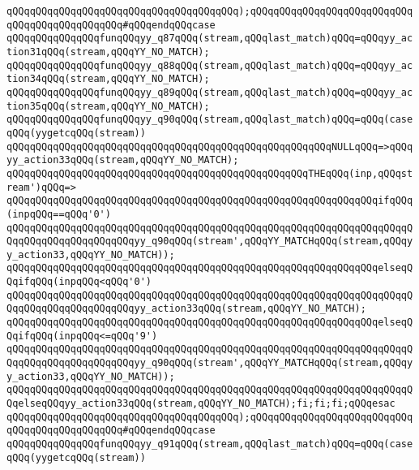 \verb|qQQqqQQqqQQqqQQqqQQqqQQqqQQqqQQqqQQqqQQq);qQQqqQQqqQQqqQQqqQQqqQQqqQQqqQQqqQQqqQQqqQQqqQQq#qQQqendqQQqcase|\newline
\verb|qQQqqQQqqQQqqQQqfunqQQqyy_q87qQQq(stream,qQQqlast_match)qQQq=qQQqyy_action31qQQq(stream,qQQqYY_NO_MATCH);|\newline
\verb|qQQqqQQqqQQqqQQqfunqQQqyy_q88qQQq(stream,qQQqlast_match)qQQq=qQQqyy_action34qQQq(stream,qQQqYY_NO_MATCH);|\newline
\verb|qQQqqQQqqQQqqQQqfunqQQqyy_q89qQQq(stream,qQQqlast_match)qQQq=qQQqyy_action35qQQq(stream,qQQqYY_NO_MATCH);|\newline
\verb|qQQqqQQqqQQqqQQqfunqQQqyy_q90qQQq(stream,qQQqlast_match)qQQq=qQQq(caseqQQq(yygetcqQQq(stream))|\newline
\verb|qQQqqQQqqQQqqQQqqQQqqQQqqQQqqQQqqQQqqQQqqQQqqQQqqQQqqQQqNULLqQQq=>qQQqyy_action33qQQq(stream,qQQqYY_NO_MATCH);|\newline
\verb|qQQqqQQqqQQqqQQqqQQqqQQqqQQqqQQqqQQqqQQqqQQqqQQqqQQqTHEqQQq(inp,qQQqstream')qQQq=>|\newline
\verb|qQQqqQQqqQQqqQQqqQQqqQQqqQQqqQQqqQQqqQQqqQQqqQQqqQQqqQQqqQQqqQQqifqQQq(inpqQQq==qQQq'0')|\newline
\verb|qQQqqQQqqQQqqQQqqQQqqQQqqQQqqQQqqQQqqQQqqQQqqQQqqQQqqQQqqQQqqQQqqQQqqQQqqQQqqQQqqQQqqQQqqQQqyy_q90qQQq(stream',qQQqYY_MATCHqQQq(stream,qQQqyy_action33,qQQqYY_NO_MATCH));|\newline
\verb|qQQqqQQqqQQqqQQqqQQqqQQqqQQqqQQqqQQqqQQqqQQqqQQqqQQqqQQqqQQqqQQqelseqQQqifqQQq(inpqQQq<qQQq'0')|\newline
\verb|qQQqqQQqqQQqqQQqqQQqqQQqqQQqqQQqqQQqqQQqqQQqqQQqqQQqqQQqqQQqqQQqqQQqqQQqqQQqqQQqqQQqqQQqqQQqyy_action33qQQq(stream,qQQqYY_NO_MATCH);|\newline
\verb|qQQqqQQqqQQqqQQqqQQqqQQqqQQqqQQqqQQqqQQqqQQqqQQqqQQqqQQqqQQqqQQqelseqQQqifqQQq(inpqQQq<=qQQq'9')|\newline
\verb|qQQqqQQqqQQqqQQqqQQqqQQqqQQqqQQqqQQqqQQqqQQqqQQqqQQqqQQqqQQqqQQqqQQqqQQqqQQqqQQqqQQqqQQqqQQqyy_q90qQQq(stream',qQQqYY_MATCHqQQq(stream,qQQqyy_action33,qQQqYY_NO_MATCH));|\newline
\verb|qQQqqQQqqQQqqQQqqQQqqQQqqQQqqQQqqQQqqQQqqQQqqQQqqQQqqQQqqQQqqQQqqQQqqQQqelseqQQqyy_action33qQQq(stream,qQQqYY_NO_MATCH);fi;fi;fi;qQQqesac|\newline
\verb|qQQqqQQqqQQqqQQqqQQqqQQqqQQqqQQqqQQqqQQq);qQQqqQQqqQQqqQQqqQQqqQQqqQQqqQQqqQQqqQQqqQQqqQQq#qQQqendqQQqcase|\newline
\verb|qQQqqQQqqQQqqQQqfunqQQqyy_q91qQQq(stream,qQQqlast_match)qQQq=qQQq(caseqQQq(yygetcqQQq(stream))|\newline
